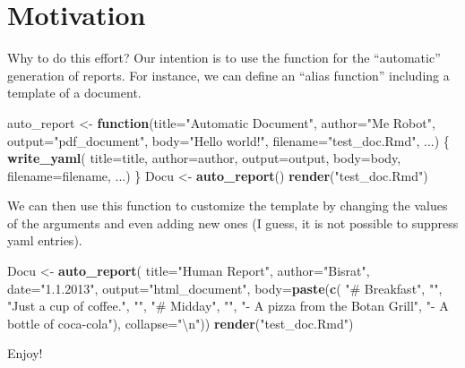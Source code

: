 \documentclass[
]{article}
\newenvironment{Shaded}{\begin{snugshade}}{\end{snugshade}}
\newcommand{\CharTok}[1]{\textcolor[rgb]{0.31,0.60,0.02}{#1}}
\newcommand{\ControlFlowTok}[1]{\textcolor[rgb]{0.13,0.29,0.53}{\textbf{#1}}}
\newcommand{\DataTypeTok}[1]{\textcolor[rgb]{0.13,0.29,0.53}{#1}}
\newcommand{\KeywordTok}[1]{\textcolor[rgb]{0.13,0.29,0.53}{\textbf{#1}}}
\newcommand{\NormalTok}[1]{#1}
\newcommand{\StringTok}[1]{\textcolor[rgb]{0.31,0.60,0.02}{#1}}
\begin{document}
\hypertarget{motivation}{%
\section{Motivation}\label{motivation}}

Why to do this effort? Our intention is to use the function for the
``automatic'' generation of reports. For instance, we can define an
``alias function'' including a template of a document.

\begin{Shaded}
\begin{Highlighting}[]
\NormalTok{auto\_report \textless{}{-}}\StringTok{ }\ControlFlowTok{function}\NormalTok{(}\DataTypeTok{title=}\StringTok{"Automatic Document"}\NormalTok{,}
        \DataTypeTok{author=}\StringTok{"Me Robot"}\NormalTok{,}
        \DataTypeTok{output=}\StringTok{"pdf\_document"}\NormalTok{,}
        \DataTypeTok{body=}\StringTok{"Hello world!"}\NormalTok{,}
        \DataTypeTok{filename=}\StringTok{"test\_doc.Rmd"}\NormalTok{, ...) \{}
    \KeywordTok{write\_yaml}\NormalTok{(}
            \DataTypeTok{title=}\NormalTok{title,}
            \DataTypeTok{author=}\NormalTok{author,}
            \DataTypeTok{output=}\NormalTok{output,}
            \DataTypeTok{body=}\NormalTok{body,}
            \DataTypeTok{filename=}\NormalTok{filename,}
\NormalTok{            ...)}
\NormalTok{\}}
\NormalTok{Docu \textless{}{-}}\StringTok{ }\KeywordTok{auto\_report}\NormalTok{()}
\KeywordTok{render}\NormalTok{(}\StringTok{"test\_doc.Rmd"}\NormalTok{)}
\end{Highlighting}
\end{Shaded}

We can then use this function to customize the template by changing the
values of the arguments and even adding new ones (I guess, it is not
possible to suppress yaml entries).

\begin{Shaded}
\begin{Highlighting}[]
\NormalTok{Docu \textless{}{-}}\StringTok{ }\KeywordTok{auto\_report}\NormalTok{(}
        \DataTypeTok{title=}\StringTok{"Human Report"}\NormalTok{,}
        \DataTypeTok{author=}\StringTok{"Bisrat"}\NormalTok{,}
        \DataTypeTok{date=}\StringTok{"1.1.2013"}\NormalTok{,}
        \DataTypeTok{output=}\StringTok{"html\_document"}\NormalTok{,}
        \DataTypeTok{body=}\KeywordTok{paste}\NormalTok{(}\KeywordTok{c}\NormalTok{(}
                        \StringTok{"\# Breakfast"}\NormalTok{,}
                        \StringTok{""}\NormalTok{,}
                        \StringTok{"Just a cup of coffee."}\NormalTok{,}
                        \StringTok{""}\NormalTok{,}
                        \StringTok{"\# Midday"}\NormalTok{,}
                        \StringTok{""}\NormalTok{,}
                        \StringTok{"{-} A pizza from the Botan Grill"}\NormalTok{,}
                        \StringTok{"{-} A bottle of coca{-}cola"}\NormalTok{),}
                \DataTypeTok{collapse=}\StringTok{"}\CharTok{\textbackslash{}n}\StringTok{"}\NormalTok{))}
\KeywordTok{render}\NormalTok{(}\StringTok{"test\_doc.Rmd"}\NormalTok{)}
\end{Highlighting}
\end{Shaded}

Enjoy!
\end{document}
